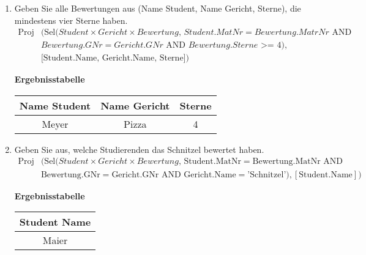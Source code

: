 \begin{enumerate}
    \item Geben Sie alle Bewertungen aus (Name Student, Name Gericht, Sterne), die mindestens vier Sterne haben.
        \begin{align*}
            \text{Proj}&\bigl(
            \text{Sel}(Student \times Gericht \times Bewertung,\, Student.MatNr=Bewertung.MatrNr \text{ AND }\\
            &Bewertung.GNr=Gericht.GNr \text{ AND } Bewertung.Sterne\text{ >= } 4),\\
            &\text{[Student.Name, Gericht.Name, Sterne]}
            \bigr)
        \end{align*}

        \begin{table}[H]
            \centering
            \textbf{Ergebnisstabelle} \\ [3pt]
            \begin{tabular}{|c|c|c|}
                \hline
                \textbf{Name Student} & \textbf{Name Gericht} & \textbf{Sterne}\\
                \hline
                Meyer & Pizza & 4 \\
                \hline  
            \end{tabular}
        \end{table}

    \item Geben Sie aus, welche Studierenden das Schnitzel bewertet haben.
        \begin{align*}
            \text{Proj}&\bigl(
            \text{Sel}(Student \times Gericht \times Bewertung,\,
            \text{Student.MatNr} = \text{Bewertung.MatNr} \text{ AND }\\
            &\text{Bewertung.GNr} = \text{Gericht.GNr} \text{ AND }
            \text{Gericht.Name} = \text{'Schnitzel'}),
            [\text{Student.Name}]
            \bigr)
            \end{align*}

        \begin{table}[H]
            \centering
            \textbf{Ergebnisstabelle} \\ [3pt]
            \begin{tabular}{|c|}
                \hline
                \textbf{Student Name}\\
                \hline
                Maier \\
                \hline  
            \end{tabular}
        \end{table}
        

\end{enumerate}
